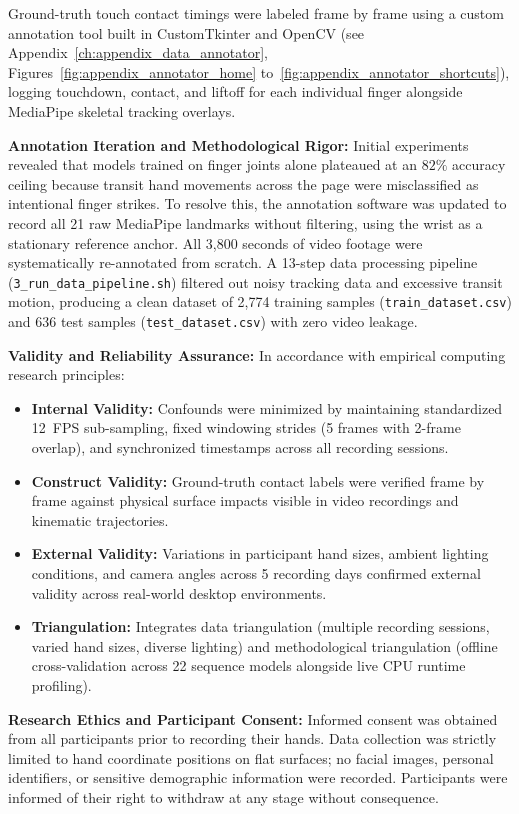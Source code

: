 Ground-truth touch contact timings were labeled frame by frame using a custom annotation tool built in CustomTkinter and OpenCV (see Appendix~\ref{ch:appendix_data_annotator}, Figures~\ref{fig:appendix_annotator_home} to~\ref{fig:appendix_annotator_shortcuts}), logging touchdown, contact, and liftoff for each individual finger alongside MediaPipe skeletal tracking overlays.

\textbf{Annotation Iteration and Methodological Rigor:} Initial experiments revealed that models trained on finger joints alone plateaued at an $82\%$ accuracy ceiling because transit hand movements across the page were misclassified as intentional finger strikes. To resolve this, the annotation software was updated to record all 21 raw MediaPipe landmarks without filtering, using the wrist as a stationary reference anchor. All 3,800 seconds of video footage were systematically re-annotated from scratch. A 13-step data processing pipeline (\texttt{3\_run\_data\_pipeline.sh}) filtered out noisy tracking data and excessive transit motion, producing a clean dataset of 2,774 training samples (\texttt{train\_dataset.csv}) and 636 test samples (\texttt{test\_dataset.csv}) with zero video leakage.

\textbf{Validity and Reliability Assurance:} In accordance with empirical computing research principles:
\begin{itemize}
    \item \textbf{Internal Validity:} Confounds were minimized by maintaining standardized 12~FPS sub-sampling, fixed windowing strides (5 frames with 2-frame overlap), and synchronized timestamps across all recording sessions.
    \item \textbf{Construct Validity:} Ground-truth contact labels were verified frame by frame against physical surface impacts visible in video recordings and kinematic trajectories.
    \item \textbf{External Validity:} Variations in participant hand sizes, ambient lighting conditions, and camera angles across 5 recording days confirmed external validity across real-world desktop environments.
    \item \textbf{Triangulation:} Integrates data triangulation (multiple recording sessions, varied hand sizes, diverse lighting) and methodological triangulation (offline cross-validation across 22 sequence models alongside live CPU runtime profiling).
\end{itemize}

\textbf{Research Ethics and Participant Consent:} Informed consent was obtained from all participants prior to recording their hands. Data collection was strictly limited to hand coordinate positions on flat surfaces; no facial images, personal identifiers, or sensitive demographic information were recorded. Participants were informed of their right to withdraw at any stage without consequence.

